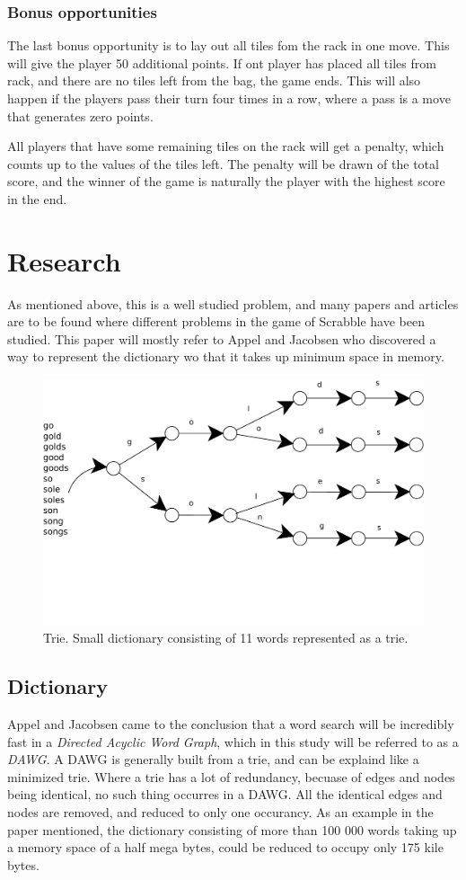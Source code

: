 \documentclass[a4paper, 12pt]{report}
\begin{document}
\subsubsection{Bonus opportunities}
The last bonus opportunity is to lay out all tiles fom the rack in one move. This will give the player 50  additional points. If ont player has placed all tiles from rack, and there are no tiles left from the bag, the game ends. This will also happen if the players pass their turn four times in a row, where a pass is a move that generates zero points. 

All players that have some remaining tiles on the rack will get a penalty, which counts up to the values of the tiles left. The penalty will be drawn of the total score, and the winner of the game is naturally the player with the highest score in the end.

\section{Research}
As mentioned above, this is a well studied problem, and many papers and articles are to be found where different problems in the game of Scrabble have been studied. This paper will mostly refer to Appel and Jacobsen \cite{fastest} who discovered a way to represent the dictionary wo that it takes up minimum space in memory.
\begin{figure}[h]
\centering
\includegraphics[scale=0.5]{trie}
\caption{Trie. Small dictionary consisting of 11 words represented as a trie.}
\end{figure}
\subsection{Dictionary}
Appel and Jacobsen \cite{fastest} came to the conclusion that a word search will be incredibly fast in a \emph{Directed Acyclic Word Graph}, which in this study will be referred to as a \emph{DAWG}. A DAWG is generally built from a trie, and can be explaind like a minimized trie. Where a trie has a lot of redundancy, becuase of edges and nodes being identical, no such thing occurres in a DAWG. All the identical edges and nodes are removed, and reduced to only one occurancy. As an example in the paper mentioned, the dictionary consisting of more than 100 000 words taking up a memory space of a half mega bytes, could be reduced to occupy only 175 kile bytes.
\end{document}
